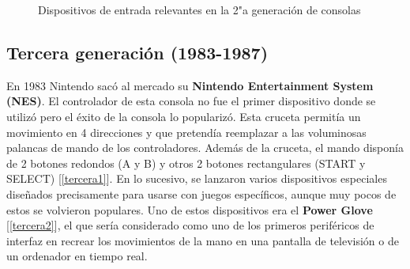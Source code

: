 \begin{figure}[!ht]
     \hfill
\hfill
     \caption{Dispositivos de entrada relevantes en la 2"a  generaci\'on de consolas}
     \label{fig:segunda}
   \end{figure}

\subsection{Tercera generaci\'on (1983-1987)}

En 1983 Nintendo sac\'o al mercado su \textbf{Nintendo Entertainment System (NES)}. El controlador de esta consola no fue el primer dispositivo donde se utiliz\'o pero el \'exito de la consola lo populariz\'o. Esta cruceta permit\'ia un movimiento en 4 direcciones y que pretend\'ia reemplazar a las voluminosas palancas de mando de los controladores. Adem\'as de la cruceta, el mando dispon\'ia de 2 botones redondos (A y B) y otros 2 botones rectangulares (START y SELECT) [\ref{tercera1}]. En lo sucesivo, se lanzaron varios dispositivos especiales dise\~nados precisamente para usarse con juegos espec\'ificos, aunque muy pocos de estos se volvieron populares. Uno de estos dispositivos era el \textbf{Power Glove} [\ref{tercera2}], el que ser\'ia considerado como uno de los primeros perif\'ericos de interfaz en recrear los movimientos de la mano en una pantalla de televisi\'on o de un ordenador en tiempo real. 


